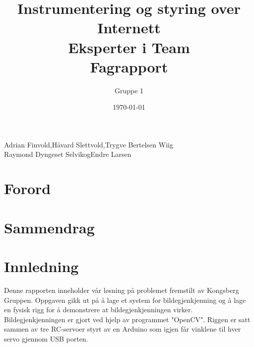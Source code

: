 \documentclass[a4paper, 11pt]{article}
\title{Instrumentering og styring over Internett\\Eksperter i Team\\Fagrapport}
\author{Gruppe 1}
\date{\today}
\newcommand{\HS}{Håvard Slettvold}
\newcommand{\AF}{Adrian Finvold}
\newcommand{\TW}{Trygve Bertelsen Wiig}
\newcommand{\RS}{Raymond Dyngeset Selvik}
\newcommand{\EL}{Endre Larsen}
\begin{document}
 

\thispagestyle{fancy} %

\maketitle 

\vspace*{\fill}
\begin{center}
\AF,\hspace{0.1cm}\HS,\hspace{0.1cm}\TW \\
\RS\hspace{0.1cm}og\hspace{0.1cm}\EL
\end{center}

\clearpage

 \newpage
\section*{Forord}

 \newpage
\section*{Sammendrag}


 \newpage

 \tableofcontents
\newpage


 \newpage
\section{Innledning}
Denne rapporten inneholder vår løsning på problemet fremstilt av Kongsberg Gruppen. Oppgaven gikk ut på å lage et system for bildegjenkjenning og å lage en fysisk rigg for å demonstrere at bildegjenkjenningen virker. Bildegjenkjenningen er gjort ved hjelp av programmet "OpenCV". Riggen er satt sammen av tre RC-servoer styrt av en Arduino som igjen får vinklene til hver servo gjennom USB porten.
\end{document}
